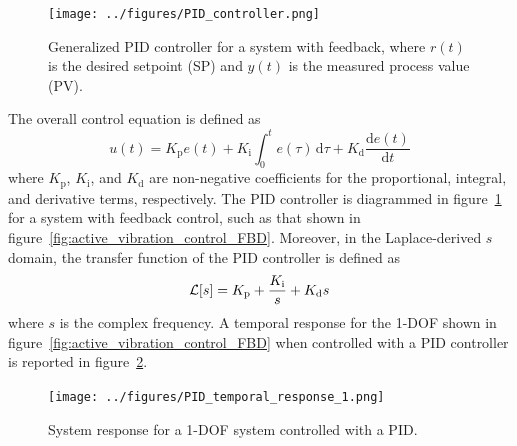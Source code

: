 \documentclass[12pt,letter]{article}
\begin{document}
\begin{figure}[H]
	\centering
	\texttt{[image: ../figures/PID\_controller.png]}
	\caption{Generalized PID controller for a system with feedback, where $r(t)$ is the desired setpoint (SP) and $y(t)$ is the measured process value (PV).}
	\label{fig:PID_controller}
\end{figure}

The overall control equation is defined as
\begin{equation}
	u(t) = K_\text{p} e(t) + K_\text{i} \int_0^t e(\tau) \,\mathrm{d}\tau + K_\text{d} \frac{\mathrm{d}e(t)}{\mathrm{d}t}
\end{equation}
where $K_\text{p}$, $K_\text{i}$, and $K_\text{d}$ are non-negative coefficients for the proportional, integral, and derivative terms, respectively. The PID controller is diagrammed in figure~\ref{fig:PID_controller} for a system with feedback control, such as that shown in figure~\ref{fig:active_vibration_control_FBD}. Moreover, in the Laplace-derived $s$ domain, the transfer function of the PID controller is defined as
\begin{equation}
	\mathcal{L}{\left[s\right]} = K_\text{p} + \frac{K_\text{i}}{s} + K_\text{d}s
\end{equation}
where $s$ is the complex frequency. A temporal response for the 1-DOF shown in figure~\ref{fig:active_vibration_control_FBD} when controlled with a PID controller is reported in figure~\ref{fig:PID_temporal_response_1}.

\begin{figure}[H]
	\centering
	\texttt{[image: ../figures/PID\_temporal\_response\_1.png]}
	\caption{System response for a 1-DOF system controlled with a PID.}
	\label{fig:PID_temporal_response_1}
\end{figure}





%
%








	\pagebreak
	\renewcommand{\thepage}{}
	\renewcommand\refname{References Cited}
	\pagestyle{plain}
	
	






















			


	
\end{document}
